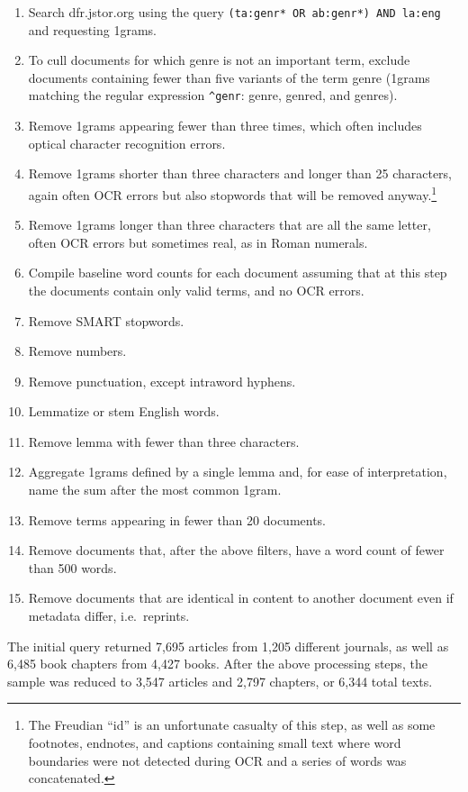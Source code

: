 \documentclass[]{book}
\providecommand{\tightlist}{%
  \setlength{\itemsep}{0pt}\setlength{\parskip}{0pt}}
\let\rmarkdownfootnote\footnote%
\def\footnote{\protect\rmarkdownfootnote}
\theoremstyle{definition}
\theoremstyle{definition}
\theoremstyle{definition}
\theoremstyle{remark}
\begin{document}
\begin{enumerate}
\def\labelenumi{\arabic{enumi}.}
\tightlist
\item
  Search dfr.jstor.org using the query
  \texttt{(ta:genr*\ OR\ ab:genr*)\ AND\ la:eng} and requesting 1grams.
\item
  To cull documents for which genre is not an important term, exclude
  documents containing fewer than five variants of the term genre
  (1grams matching the regular expression \texttt{\^{}genr}: genre,
  genred, and genres).
\item
  Remove 1grams appearing fewer than three times, which often includes
  optical character recognition errors.
\item
  Remove 1grams shorter than three characters and longer than 25
  characters, again often OCR errors but also stopwords that will be
  removed anyway.\footnote{The Freudian ``id'' is an unfortunate
    casualty of this step, as well as some footnotes, endnotes, and
    captions containing small text where word boundaries were not
    detected during OCR and a series of words was concatenated.}
\item
  Remove 1grams longer than three characters that are all the same
  letter, often OCR errors but sometimes real, as in Roman numerals.
\item
  Compile baseline word counts for each document assuming that at this
  step the documents contain only valid terms, and no OCR errors.
\item
  Remove SMART stopwords.
\item
  Remove numbers.
\item
  Remove punctuation, except intraword hyphens.
\item
  Lemmatize or stem English words.
\item
  Remove lemma with fewer than three characters.
\item
  Aggregate 1grams defined by a single lemma and, for ease of
  interpretation, name the sum after the most common 1gram.
\item
  Remove terms appearing in fewer than 20 documents.
\item
  Remove documents that, after the above filters, have a word count of
  fewer than 500 words.
\item
  Remove documents that are identical in content to another document
  even if metadata differ, i.e.~reprints.
\end{enumerate}

The initial query returned 7,695 articles from 1,205 different journals,
as well as 6,485 book chapters from 4,427 books. After the above
processing steps, the sample was reduced to 3,547 articles and 2,797
chapters, or 6,344 total texts.
\end{document}
